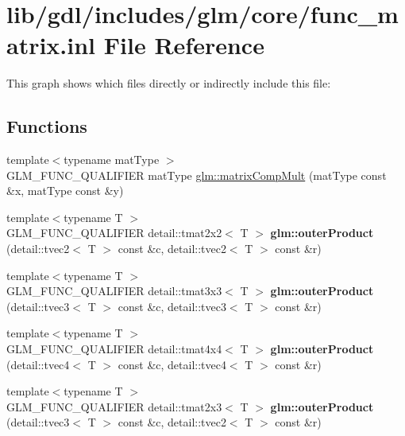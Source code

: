 \hypertarget{func__matrix_8inl}{}\section{lib/gdl/includes/glm/core/func\+\_\+matrix.inl File Reference}
\label{func__matrix_8inl}
This graph shows which files directly or indirectly include this file\+:
\subsection*{Functions}
\begin{DoxyCompactItemize}
\item 
{\footnotesize template$<$typename mat\+Type $>$ }\\G\+L\+M\+\_\+\+F\+U\+N\+C\+\_\+\+Q\+U\+A\+L\+I\+F\+I\+E\+R mat\+Type \hyperlink{group__core__func__matrix_ga171fac0b8564b1516930bb134fd297b8}{glm\+::matrix\+Comp\+Mult} (mat\+Type const \&x, mat\+Type const \&y)
\item 
\hypertarget{namespaceglm_a0cf59cce1b3f603f94cf33a61bceff19}{}{\footnotesize template$<$typename T $>$ }\\G\+L\+M\+\_\+\+F\+U\+N\+C\+\_\+\+Q\+U\+A\+L\+I\+F\+I\+E\+R detail\+::tmat2x2$<$ T $>$ {\bfseries glm\+::outer\+Product} (detail\+::tvec2$<$ T $>$ const \&c, detail\+::tvec2$<$ T $>$ const \&r)\label{namespaceglm_a0cf59cce1b3f603f94cf33a61bceff19}

\item 
\hypertarget{namespaceglm_a0be7bdc804f3e5019ed50488ad96deed}{}{\footnotesize template$<$typename T $>$ }\\G\+L\+M\+\_\+\+F\+U\+N\+C\+\_\+\+Q\+U\+A\+L\+I\+F\+I\+E\+R detail\+::tmat3x3$<$ T $>$ {\bfseries glm\+::outer\+Product} (detail\+::tvec3$<$ T $>$ const \&c, detail\+::tvec3$<$ T $>$ const \&r)\label{namespaceglm_a0be7bdc804f3e5019ed50488ad96deed}

\item 
\hypertarget{namespaceglm_a466c39ec56cd677039b0e768c2fbfbfe}{}{\footnotesize template$<$typename T $>$ }\\G\+L\+M\+\_\+\+F\+U\+N\+C\+\_\+\+Q\+U\+A\+L\+I\+F\+I\+E\+R detail\+::tmat4x4$<$ T $>$ {\bfseries glm\+::outer\+Product} (detail\+::tvec4$<$ T $>$ const \&c, detail\+::tvec4$<$ T $>$ const \&r)\label{namespaceglm_a466c39ec56cd677039b0e768c2fbfbfe}

\item 
\hypertarget{namespaceglm_a83b1b298cf0e1a51db5eeade5aaf08b1}{}{\footnotesize template$<$typename T $>$ }\\G\+L\+M\+\_\+\+F\+U\+N\+C\+\_\+\+Q\+U\+A\+L\+I\+F\+I\+E\+R detail\+::tmat2x3$<$ T $>$ {\bfseries glm\+::outer\+Product} (detail\+::tvec3$<$ T $>$ const \&c, detail\+::tvec2$<$ T $>$ const \&r)\label{namespaceglm_a83b1b298cf0e1a51db5eeade5aaf08b1}


\end{DoxyCompactItemize}
